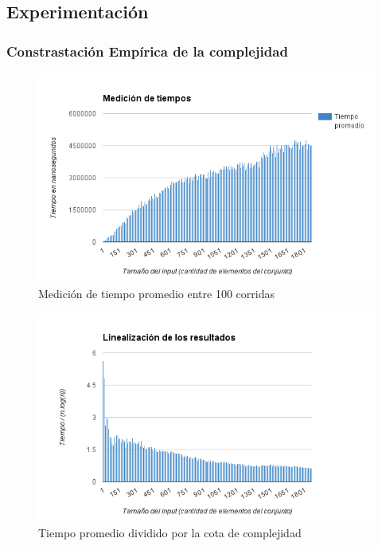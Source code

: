 \subsection{Experimentación}

\subsubsection{Constrastación Empírica de la complejidad}
\begin{figure}[h!]
   \begin{center}
 	\includegraphics[scale=0.8]{imagenes/ej2/tiempos.png}
	\caption{Medición de tiempo promedio entre 100 corridas}
	\label{estacionesRel}
   \end{center}
 \end{figure}

 \begin{figure}[h!]
   \begin{center}
 	\includegraphics[scale=0.8]{imagenes/ej2/linealizacion.png}
	\caption{Tiempo promedio dividido por la cota de complejidad}
	\label{estacionesRel}
   \end{center}
 \end{figure}

